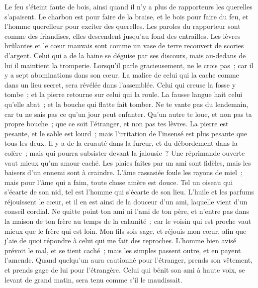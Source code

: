 \begin{multicols}{2}
Le feu s'éteint faute de bois, ainsi quand il n'y a plus de rapporteurs les querelles s'apaisent.
Le charbon est pour faire de la braise, et le bois pour faire du feu, et l'homme querelleur pour exciter des querelles.
Les paroles du rapporteur sont comme des friandises, elles descendent jusqu'au fond des entrailles.
Les lèvres brûlantes et le cœur mauvais sont comme un vase de terre recouvert de scories d'argent.
Celui qui a de la haine se déguise par ses discours, mais au-dedans de lui il maintient la tromperie.
Lorsqu'il parle gracieusement, ne le crois pas~; car il y a sept abominations dans son cœur.
La malice de celui qui la cache comme dans un lieu secret, sera révélée dans l'assemblée.
Celui qui creuse la fosse y tombe~; et la pierre retourne sur celui qui la roule.
La fausse langue hait celui qu'elle abat~; et la bouche qui flatte fait tomber.
\VerseOne{}Ne te vante pas du lendemain, car tu ne sais pas ce qu'un jour peut enfanter.
Qu'un autre te loue, et non pas ta propre bouche~; que ce soit l'étranger, et non pas tes lèvres.
La pierre est pesante, et le sable est lourd~; mais l'irritation de l'insensé est plus pesante que tous les deux.
Il y a de la cruauté dans la fureur, et du débordement dans la colère~; mais qui pourra subsister devant la jalousie~?
Une réprimande ouverte vaut mieux qu'un amour caché.
Les plaies faites par un ami sont fidèles, mais les baisers d'un ennemi sont à craindre.
L'âme rassasiée foule les rayons de miel~; mais pour l'âme qui a faim, toute chose amère est douce.
Tel un oiseau qui s'écarte de son nid, tel est l'homme qui s'écarte de son lieu.
L'huile et les parfums réjouissent le cœur, et il en est ainsi de la douceur d'un ami, laquelle vient d'un conseil cordial.
Ne quitte point ton ami ni l'ami de ton père, et n'entre pas dans la maison de ton frère au temps de la calamité~; car le voisin qui est proche vaut mieux que le frère qui est loin.
Mon fils sois sage, et réjouis mon cœur, afin que j'aie de quoi répondre à celui qui me fait des reproches.
L'homme bien avisé prévoit le mal, et se tient caché~; mais les simples passent outre, et en payent l'amende.
Quand quelqu'un aura cautionné pour l'étranger, prends son vêtement, et prends gage de lui pour l'étrangère.
Celui qui bénit son ami à haute voix, se levant de grand matin, sera tenu comme s'il le maudissait.

\end{multicols}
